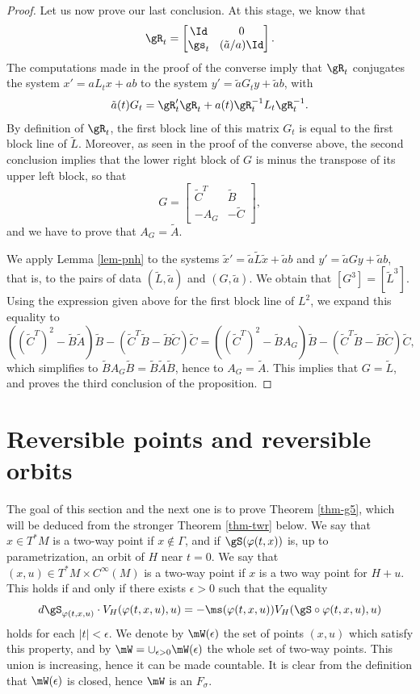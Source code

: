 \begin{proof}
Let us now prove our last conclusion. At this stage, we know that\vspace*{-3pt}
\[\arraycolsep4.5pt
\gR_t = \begin{bmatrix}
\Id&0\\ \gs_t & (\tilde a /a) \Id
\end{bmatrix}.
\]
The computations made in the proof of the converse imply that
$\gR_t$ conjugates the system $x'=aL_tx+ab$ to the system $y'=\tilde a G_t y +\tilde a b$,
with\vspace*{-3pt}
\[
\tilde a (t) G_t=\gR_t'\gR_t +a(t)\gR_t^{-1} L_t\gR_t^{-1}.
\]
By definition of $\gR_t$, the first block line of this matrix $G_t$ is equal to the first block line of $\tilde L$.
Moreover, as seen in the proof of the converse above, the second conclusion implies that the lower right block of $G$
is minus the transpose of its upper left block, so that\vspace*{-3pt}
\[
G=\begin{bmatrix}
\tilde C^T & \tilde B\\ -A_G & -\tilde C
\end{bmatrix},
\]
and we have to prove that $A_G=\tilde A$.

We apply Lemma \ref{lem-pnh} to the systems $\tilde x'=\tilde a \tilde L \tilde x+ \tilde a b$ and
$y'=\tilde a G y +\tilde a b$, that is, to the pairs of data $(\tilde L, \tilde a)$ and $(G,\tilde a)$.
We obtain that $[G^3]=[\tilde L^3]$.
Using the expression given above for the first block line of $L^2$, we
expand this equality to
\[
((\tilde C^T)^2-\tilde B \tilde A)\tilde B-(\tilde C^T\tilde B-\tilde B\tilde C)\tilde C=
((\tilde C^T)^2-\tilde B A_G)\tilde B-(\tilde C^T\tilde B-\tilde B\tilde C)\tilde C,
\]
which simplifies to $\tilde BA_G\tilde B= \tilde B \tilde A \tilde B$, hence to $A_G=\tilde A$.
This implies that $G=\tilde L$, and proves the third conclusion of the proposition.
\end{proof}

\section{Reversible points and reversible orbits}\label{sec-rev}

The goal of this section and the next one is to prove Theorem \ref{thm-g5},
which will be deduced from the stronger Theorem \ref{thm-twr} below.
We say that $x\in T^*M$ is a two-way point if $x\not \in \Gamma$, and if $\gS(\varphi(t,x))$ is, up to parametrization,
an orbit of $H$ near $t=0$. We say that $(x,u)\in T^*M \times C^{\infty}(M)$ is a two-way point if $x$ is a two way point for $H+u$.
This holds if and only if there exists $\epsilon>0$ such that the equality
\[
d\gS_{\varphi(t,x,u)}\cdot V_H(\varphi(t,x,u),u)=-\ms(\varphi(t,x,u))V_H(\gS\circ \varphi(t,x,u),u)
\]
holds for each $|t|<\epsilon$. We denote by $\mW(\epsilon)$ the set of points $(x,u)$ which satisfy this property, and by
$\mW=\cup_{\epsilon>0} \mW(\epsilon)$ the whole set of two-way points. This union is increasing, hence it can be made countable.
It is clear from the definition that $\mW(\epsilon)$ is closed, hence $\mW$ is an $F_{\sigma}$.

